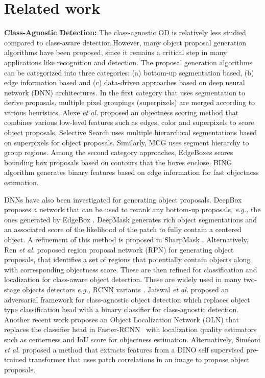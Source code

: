 \documentclass[runningheads]{llncs}
\def\eg{\emph{e.g.,}\xspace} \def\Eg{\emph{E.g.}\xspace}
\def\etal{\emph{et al.}\xspace}
\begin{document}
\section{Related work}\label{app:related_work}
\noindent \textbf{Class-Agnostic Detection:} 
The class-agnostic OD is relatively less studied compared to class-aware detection.However, many object proposal generation algorithms have been proposed, since it remains a critical step in many applications like recognition and detection. The proposal generation algorithms can be categorized into three categories: (a) bottom-up segmentation based, (b) edge information based and (c) data-driven approaches based on deep neural network (DNN) architectures. 
In the first category that uses segmentation to derive proposals, multiple pixel groupings (superpixels) are merged according to various heuristics. Alexe \etal proposed an objectness \cite{alexe2012measuring} scoring method that combines various low-level features such as edges, color and superpixels to score object proposals. Selective Search \cite{uijlings2013selective} uses multiple hierarchical segmentations based on superpixels for object proposals. Similarly, MCG \cite{pont2016multiscale} uses segment hierarchy to group regions. Among the second category approaches, EdgeBoxes \cite{zitnick2014edge} scores bounding box proposals based on contours that the boxes enclose. BING algorithm \cite{cheng2014bing,zhang2015bing++} generates binary features based on edge information for fast objectness estimation. 

DNNs have also been investigated for generating object proposals. DeepBox \cite{kuo2015deepbox} proposes a network that can be used to rerank any bottom-up proposals, \eg the ones generated by EdgeBox \cite{zitnick2014edge}. DeepMask \cite{pinheiro2015learning} generates rich object segmentations and an associated score of the likelihood of the patch to fully contain a centered object. A refinement of this method is proposed in SharpMask \cite{pinheiro2016learning}. Alternatively, Ren \etal proposed region proposal network (RPN) \cite{ren2015faster} for generating object proposals, that identifies a set of regions that potentially contain objects along with corresponding objectness score. These are then refined for classification and localization for class-aware object detection. These are widely used in many two-stage objects detectors \eg RCNN variants  \cite{ren2015faster,he2017mask,lin2017feature}. Jaiswal \etal proposed an adversarial framework \cite{jaiswal2021class} for class-agnostic object detection which replaces object type classification head with a binary classifier for class-agnostic detection. 
Another recent work proposes an Object Localization Network (OLN) \cite{kim2021learning} that replaces the classifier head in Faster-RCNN~\cite{ren2015faster}  with localization quality estimators such as centerness and IoU score for objectness estimation. 
Alternatively, Sim{\'e}oni \etal proposed a method \cite{simeoni2021localizing} that extracts features from a DINO \cite{caron2021emerging} self supervised pre-trained transformer that uses patch correlations in an image to propose object proposals.  
\end{document}
